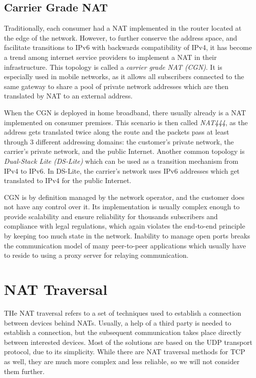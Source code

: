 
\subsection{Carrier Grade NAT}

Traditionally, each consumer had a NAT implemented in the router located at the edge of the network. However, to further conserve the address space, and facilitate transitions to IPv6 with backwards compatibility of IPv4, it has become a trend among internet service providers to implement a NAT in their infrastructure. This topology is called a \textit{carrier grade NAT (CGN)}. It is especially used in mobile networks, as it allows all subscribers connected to the same gateway to share a pool of private network addresses which are then translated by NAT to an external address.

When the CGN is deployed in home broadband, there usually already is a NAT implemented on consumer premises. This scenario is then called \textit{NAT444}, as the address gets translated twice along the route and the packets pass at least through 3 different addressing domains: the customer's private network, the carrier's private network, and the public Internet. Another common topology is \textit{Dual-Stack Lite (DS-Lite)} which can be used as a transition mechanism from IPv4 to IPv6. In DS-Lite, the carrier's network uses IPv6 addresses which get translated to IPv4 for the public Internet.

CGN is by definition managed by the network operator, and the customer does not have any control over it. Its implementation is usually complex enough to provide scalability and ensure reliability for thousands subscribers and compliance with legal regulations, which again violates the end-to-end principle by keeping too much state in the network. Inability to manage open ports breaks the communication model of many peer-to-peer applications which usually have to reside to using a proxy server for relaying communication.

\section{NAT Traversal}

THe NAT traversal refers to a set of techniques used to establish a connection between devices behind NATs. Usually, a help of a third party is needed to establish a connection, but the subsequent communication takes place directly between interested devices.
Most of the solutions are based on the UDP transport protocol, due to its simplicity. While there are NAT traversal methods for TCP as well, they are much more complex and less reliable, so we will not consider them further.

